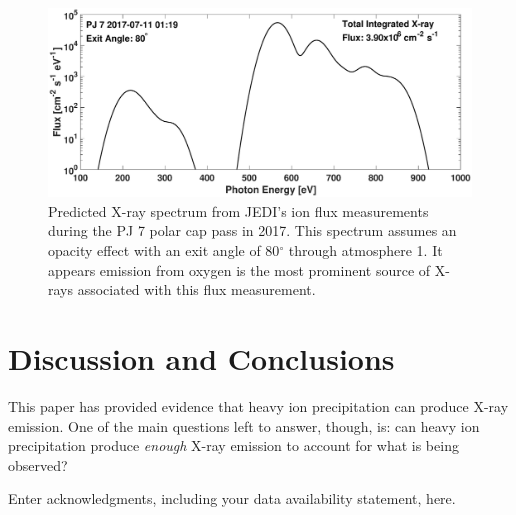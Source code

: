 \documentclass[draft]{agujournal2018}
\begin{document}
\begin{figure}[ht]
    \centering
    \includegraphics[width=\textwidth]{Figures/PJ7Spectrum.eps}
    \caption{Predicted X-ray spectrum from JEDI's ion flux measurements during the PJ 7 polar cap pass in 2017. This spectrum assumes an opacity effect with an exit angle of 80$^{\circ}$ through atmosphere 1. It appears emission from oxygen is the most prominent source of X-rays associated with this flux measurement.}
    \label{fig:JEDISpec}
\end{figure}

\section{Discussion and Conclusions}

This paper has provided evidence that heavy ion precipitation can produce X-ray emission.
One of the main questions left to answer, though, is: can heavy ion precipitation produce \textit{enough} X-ray emission to account for what is being observed?
 


%
%
%
%
%
%
%
%


\acknowledgments
Enter acknowledgments, including your data availability statement, here.





\appendix


\end{document}
